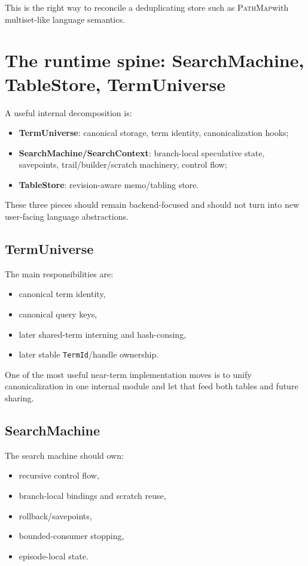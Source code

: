 \documentclass[11pt]{article}
\newcommand{\PathMap}{\textsc{PathMap}}
\begin{document}
This is the right way to reconcile a deduplicating store such as \PathMap with multiset-like language semantics.

\section{The runtime spine: SearchMachine, TableStore, TermUniverse}
A useful internal decomposition is:
\begin{itemize}
    \item \textbf{TermUniverse}: canonical storage, term identity, canonicalization hooks;
    \item \textbf{SearchMachine/SearchContext}: branch-local speculative state, savepoints, trail/builder/scratch machinery, control flow;
    \item \textbf{TableStore}: revision-aware memo/tabling store.
\end{itemize}

These three pieces should remain backend-focused and should not turn into new user-facing language abstractions.

\subsection{TermUniverse}
The main responsibilities are:
\begin{itemize}
    \item canonical term identity,
    \item canonical query keys,
    \item later shared-term interning and hash-consing,
    \item later stable \texttt{TermId}/handle ownership.
\end{itemize}

One of the most useful near-term implementation moves is to unify canonicalization in one internal module and let that feed both tables and future sharing.

\subsection{SearchMachine}
The search machine should own:
\begin{itemize}
    \item recursive control flow,
    \item branch-local bindings and scratch reuse,
    \item rollback/savepoints,
    \item bounded-consumer stopping,
    \item episode-local state.
\end{itemize}
\end{document}
